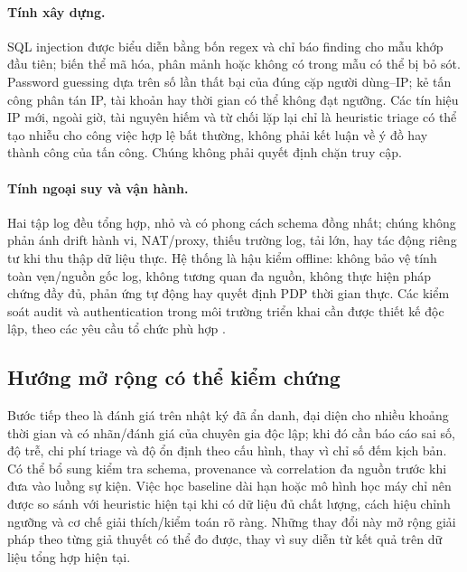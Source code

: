 \paragraph{Tính xây dựng.} SQL injection được biểu diễn bằng bốn regex và chỉ
báo finding cho mẫu khớp đầu tiên; biến thể mã hóa, phân mảnh hoặc không có
trong mẫu có thể bị bỏ sót. Password guessing dựa trên số lần thất bại của đúng
cặp người dùng--IP; kẻ tấn công phân tán IP, tài khoản hay thời gian có thể
không đạt ngưỡng. Các tín hiệu IP mới, ngoài giờ, tài nguyên hiếm và từ chối
lặp lại chỉ là heuristic triage có thể tạo nhiễu cho công việc hợp lệ bất thường,
không phải kết luận về ý đồ hay thành công của tấn công. Chúng không phải quyết
định chặn truy cập.

\paragraph{Tính ngoại suy và vận hành.} Hai tập log đều tổng hợp, nhỏ và có
phong cách schema đồng nhất; chúng không phản ánh drift hành vi, NAT/proxy,
thiếu trường log, tải lớn, hay tác động riêng tư khi thu thập dữ liệu thực. Hệ
thống là hậu kiểm offline: không bảo vệ tính toàn vẹn/nguồn gốc log, không
tương quan đa nguồn, không thực hiện pháp chứng đầy đủ, phản ứng tự động hay
quyết định PDP thời gian thực. Các kiểm soát audit và authentication trong môi
trường triển khai cần được thiết kế độc lập, theo các yêu cầu tổ chức phù hợp
\cite{JTF2020SP80053,NIST2025SP80063B}.

\subsection{Hướng mở rộng có thể kiểm chứng}

Bước tiếp theo là đánh giá trên nhật ký đã ẩn danh, đại diện cho nhiều khoảng
thời gian và có nhãn/đánh giá của chuyên gia độc lập; khi đó cần báo cáo sai số,
độ trễ, chi phí triage và độ ổn định theo cấu hình, thay vì chỉ số đếm kịch bản.
Có thể bổ sung kiểm tra schema, provenance và correlation đa nguồn trước khi
đưa vào luồng sự kiện. Việc học baseline dài hạn hoặc mô hình học máy chỉ nên
được so sánh với heuristic hiện tại khi có dữ liệu đủ chất lượng, cách hiệu
chỉnh ngưỡng và cơ chế giải thích/kiểm toán rõ ràng. Những thay đổi này mở rộng
giải pháp theo từng giả thuyết có thể đo được, thay vì suy diễn từ kết quả trên
dữ liệu tổng hợp hiện tại.
